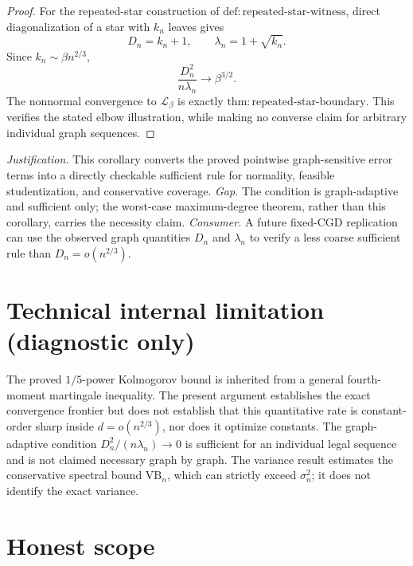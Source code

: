 \documentclass{article}
\begin{document}
\begin{proof}
For the repeated-star construction of \(\mathrm{def:repeated\text{-}star\text{-}witness}\), direct diagonalization of a star with \(k_n\) leaves gives
\[
 D_n=k_n+1,
 \qquad
 \lambda_n=1+\sqrt{k_n}.
\]
Since \(k_n\sim\beta n^{2/3}\),
\[
 \frac{D_n^2}{n\lambda_n}\longrightarrow\beta^{3/2}.
\]
The nonnormal convergence to \(\mathcal L_\beta\) is exactly \(\mathrm{thm:repeated\text{-}star\text{-}boundary}\).  This verifies the stated elbow illustration, while making no converse claim for arbitrary individual graph sequences.
\end{proof}
\par\smallskip\noindent \textit{Justification.} This corollary converts the proved pointwise graph-sensitive error terms into a directly checkable sufficient rule for normality, feasible studentization, and conservative coverage. \textit{Gap.} The condition is graph-adaptive and sufficient only; the worst-case maximum-degree theorem, rather than this corollary, carries the necessity claim. \textit{Consumer.} A future fixed-CGD replication can use the observed graph quantities \(D_n\) and \(\lambda_n\) to verify a less coarse sufficient rule than \(D_n=o(n^{2/3})\).

\section*{Technical internal limitation (diagnostic only)}

The proved \(1/5\)-power Kolmogorov bound is inherited from a general fourth-moment martingale inequality. The present argument establishes the exact convergence frontier but does not establish that this quantitative rate is constant-order sharp inside \(d=o(n^{2/3})\), nor does it optimize constants. The graph-adaptive condition \(D_n^2/(n\lambda_n)\to0\) is sufficient for an individual legal sequence and is not claimed necessary graph by graph. The variance result estimates the conservative spectral bound \(\mathrm{VB}_n\), which can strictly exceed \(\sigma_n^2\); it does not identify the exact variance.

\section{Honest scope}
\end{document}
